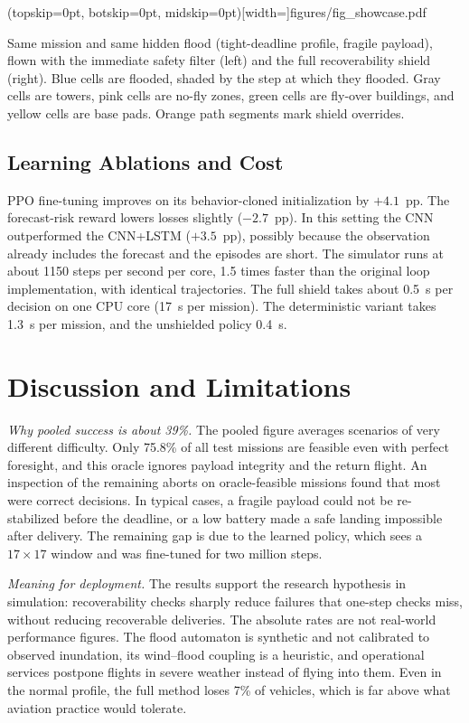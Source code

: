\documentclass{ieeeaccess}
\newcommand{\widecap}[1]{\parbox[t]{0.89\textwidth}{\raggedright #1}}
\begin{document}
\Figure[t!](topskip=0pt, botskip=0pt, midskip=0pt)[width=\textwidth]{figures/fig_showcase.pdf}
{\widecap{Same mission and same hidden flood (tight-deadline profile, fragile payload), flown with the immediate safety filter (left) and the full recoverability shield (right). Blue cells are flooded, shaded by the step at which they flooded. Gray cells are towers, pink cells are no-fly zones, green cells are fly-over buildings, and yellow cells are base pads. Orange path segments mark shield overrides.}\label{fig:showcase}}

\subsection{Learning Ablations and Cost}
PPO fine-tuning improves on its behavior-cloned initialization by $+4.1$~pp. The forecast-risk reward lowers losses slightly ($-2.7$~pp). In this setting the CNN outperformed the CNN+LSTM ($+3.5$~pp), possibly because the observation already includes the forecast and the episodes are short. The simulator runs at about 1150 steps per second per core, 1.5 times faster than the original loop implementation, with identical trajectories. The full shield takes about 0.5~s per decision on one CPU core (17~s per mission). The deterministic variant takes 1.3~s per mission, and the unshielded policy 0.4~s.

\section{Discussion and Limitations}
\label{sec:discussion}

\emph{Why pooled success is about 39\%.} The pooled figure averages scenarios of very different difficulty. Only 75.8\% of all test missions are feasible even with perfect foresight, and this oracle ignores payload integrity and the return flight. An inspection of the remaining aborts on oracle-feasible missions found that most were correct decisions. In typical cases, a fragile payload could not be re-stabilized before the deadline, or a low battery made a safe landing impossible after delivery. The remaining gap is due to the learned policy, which sees a $17\times17$ window and was fine-tuned for two million steps.

\emph{Meaning for deployment.} The results support the research hypothesis in simulation: recoverability checks sharply reduce failures that one-step checks miss, without reducing recoverable deliveries. The absolute rates are not real-world performance figures. The flood automaton is synthetic and not calibrated to observed inundation, its wind--flood coupling is a heuristic, and operational services postpone flights in severe weather instead of flying into them. Even in the normal profile, the full method loses 7\% of vehicles, which is far above what aviation practice would tolerate.
\end{document}
